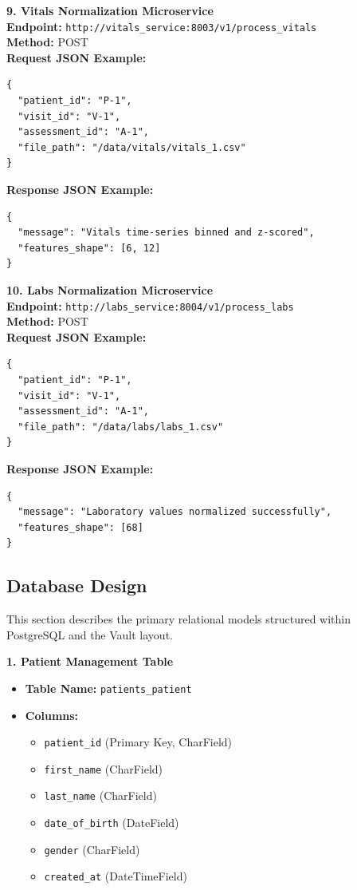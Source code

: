 \documentclass{fisatprojectfinal}
\begin{document}
\textbf{9. Vitals Normalization Microservice} \\
\textbf{Endpoint:} \texttt{http://vitals\_service:8003/v1/process\_vitals} \\
\textbf{Method:} POST \\
\textbf{Request JSON Example:}
\begin{verbatim}
{
  "patient_id": "P-1",
  "visit_id": "V-1",
  "assessment_id": "A-1",
  "file_path": "/data/vitals/vitals_1.csv"
}
\end{verbatim}
\textbf{Response JSON Example:}
\begin{verbatim}
{
  "message": "Vitals time-series binned and z-scored",
  "features_shape": [6, 12]
}
\end{verbatim}

\textbf{10. Labs Normalization Microservice} \\
\textbf{Endpoint:} \texttt{http://labs\_service:8004/v1/process\_labs} \\
\textbf{Method:} POST \\
\textbf{Request JSON Example:}
\begin{verbatim}
{
  "patient_id": "P-1",
  "visit_id": "V-1",
  "assessment_id": "A-1",
  "file_path": "/data/labs/labs_1.csv"
}
\end{verbatim}
\textbf{Response JSON Example:}
\begin{verbatim}
{
  "message": "Laboratory values normalized successfully",
  "features_shape": [68]
}
\end{verbatim}

\subsection{Database Design}
This section describes the primary relational models structured within PostgreSQL and the Vault layout.

\textbf{1. Patient Management Table}
\begin{itemize}
    \item \textbf{Table Name:} \texttt{patients\_patient}
    \item \textbf{Columns:}
    \begin{itemize}
        \item \texttt{patient\_id} (Primary Key, CharField)
        \item \texttt{first\_name} (CharField)
        \item \texttt{last\_name} (CharField)
        \item \texttt{date\_of\_birth} (DateField)
        \item \texttt{gender} (CharField)
        \item \texttt{created\_at} (DateTimeField)
    \end{itemize}
\end{itemize}
\end{document}
